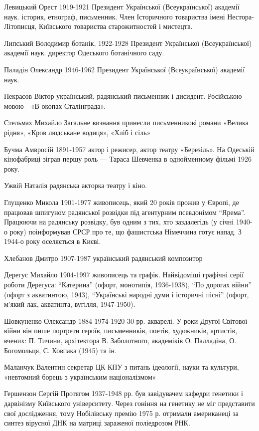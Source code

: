 Левицький Орест 1919-1921 Президент Української (Всеукраїнської) академії наук. історик, етнограф, письменник. Член Історичного товариства імені Нестора-Літописця, Київського товариства старожитностей і мистецтв.

Липський Володимир ботанік, 1922-1928 Президент Української (Всеукраїнської) академії наук. директор Одеського ботанічного саду.

Паладін Олександр 1946-1962 Президент Української (Всеукраїнської) академії наук.

Некрасов Віктор український, радянський письменник і дисидент. Російською мовою - «В окопах Сталінграда».

Стельмах Михайло Загальне визнання принесли письменникові романи «Велика рідня», «Кров людськане водиця», «Хліб і сіль»

Бучма Амвросій 1891-1957 актор і режисер, актор театру «Березіль». На Одеській кінофабриці зіграв першу роль --- Тараса Шевченка в однойменному фільмі 1926 року.

Ужвій Наталія радянська акторка театру і кіно.

Глущенко Микола 1901-1977 живописець, який 20 років прожив у Європі, де працював шпигуном радянської розвідки під агентурним псевдонімом “Ярема”. Працюючи на радянську розвідку, був одним з тих, хто заздалегідь (у січні 1940-о року) поінформував СРСР про те, що фашистська Німеччина готує напад. З 1944-о року оселяється в Києві.

Хлебанов Дмитро 1907-1987 український радянський композитор

Дерегус Михайло 1904-1997 живописець та графік. Найвідоміші графічні серії роботи Дерегуса: “Катерина” (офорт, монотипія, 1936-1938), “По дорогах війни” (офорт з акватинтою, 1943), “Українські народні думи і історичні пісні” (офорт, м’який лак, акватинта, вугілля, 1947-1950).

Шовкуненко Олександр 1884-1974 1920-30 рр. акварелі. У роки Другої Світової війни він пише портрети героїв, письменників, поетів, художників, артистів, вчених: П. Тичини, архітектора В. Заболотного, академіків О. Палладіна, О. Богомольця, С. Ковпака (1945) та ін.

Маланчук Валентин секретар ЦК КПУ з питань ідеології, науки та культури, «невтомний борець з українським націоналізмом»

Гершензон Сергій Протягом 1937-1948 рр. був завідувачем кафедри генетики і дарвінізму Київського університету. Через гоніння на генетику не міг представити свої дослідження, тому Нобілівську премію 1975 р. отримали американеці за синтез вірусної ДНК на матриці зараженої поліедрозом РНК.

